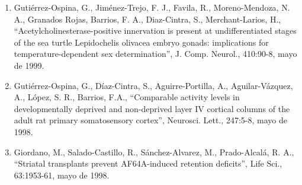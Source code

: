 \begin{enumerate}
\item Gutiérrez-Ospina, G., Jiménez-Trejo, F. J., Favila, R., Moreno-Mendoza, N. A., Granados Rojas, Barrios, F. A., Diaz-Cintra, S., 
Merchant-Larios, H., “Acetylcholinesterase-positive innervation is present at undifferentiated stages of the sea turtle Lepidochelis olivacea 
embryo gonads: implications for temperature-dependent sex determination”, J. Comp. Neurol., 410:90-8, mayo de 1999.

\item Gutiérrez-Ospina, G., Díaz-Cintra, S., Aguirre-Portilla, A., Aguilar-Vázquez, A., López, S. R., Barrios, F.A., “Comparable activity 
levels in 
developmentally deprived and non-deprived layer IV cortical columns of the adult rat primary somatosensory cortex”, Neurosci. Lett., 247:5-8, 
mayo de 1998.

\item Giordano, M., Salado-Castillo, R., Sánchez-Alvarez, M., Prado-Alcalá, R. A., “Striatal transplants prevent AF64A-induced retention 
deficits”, 
Life Sci., 63:1953-61, mayo de 1998.

\end{enumerate}

